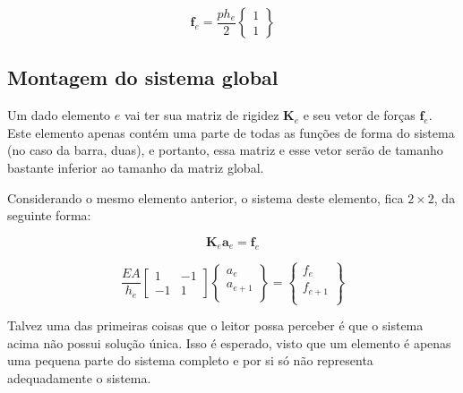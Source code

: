        \begin{equation*}
            \mathbf{f}_e = \frac{p h_e}{2}
            \begin{Bmatrix}
                1\\
                1 
            \end{Bmatrix}
        \end{equation*}


    \subsection{Montagem do sistema global}

        Um dado elemento $e$ vai ter sua matriz de rigidez $\mathbf{K}_e$ e seu vetor de forças $\mathbf{f}_e$. Este elemento apenas contém uma parte de todas as funções de forma do sistema (no caso da barra, duas), e portanto, essa matriz e esse vetor serão de tamanho bastante inferior ao tamanho da matriz global.

        Considerando o mesmo elemento anterior, o sistema deste elemento, fica $2 \times 2$, da seguinte forma:

        \begin{equation}
            \mathbf{K}_e \mathbf{a}_e = \mathbf{f}_e 
        \end{equation}
        
        \begin{equation}
            \frac{EA}{h_e}\begin{bmatrix}
                1 & -1\\
                -1 & 1
            \end{bmatrix}
            \begin{Bmatrix}
                a_{e}\\
                a_{e+1}\\
            \end{Bmatrix}=
            \begin{Bmatrix}
                f_{e}\\
                f_{e+1}\\
            \end{Bmatrix}
        \end{equation}

        Talvez uma das primeiras coisas que o leitor possa perceber é que o sistema acima não possui solução única. Isso é esperado, visto que um elemento é apenas uma pequena parte do sistema completo e por si só não representa adequadamente o sistema.

